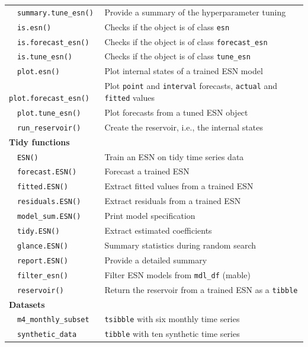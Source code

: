 \begin{longtable}[]{@{}
  >{\raggedright\arraybackslash}p{}
  >{\raggedright\arraybackslash}p{}@{}}
\(~~~\) \texttt{summary.tune\_esn()} & Provide a summary of the hyperparameter tuning \\
\(~~~\) \texttt{is.esn()} & Checks if the object is of class \texttt{esn} \\
\(~~~\) \texttt{is.forecast\_esn()} & Checks if the object is of class \texttt{forecast\_esn} \\
\(~~~\) \texttt{is.tune\_esn()} & Checks if the object is of class \texttt{tune\_esn} \\
\(~~~\) \texttt{plot.esn()} & Plot internal states of a trained ESN model \\
\(~~~\) \texttt{plot.forecast\_esn()} & Plot \texttt{point} and \texttt{interval} forecasts, \texttt{actual} and \texttt{fitted} values \\
\(~~~\) \texttt{plot.tune\_esn()} & Plot forecasts from a tuned ESN object \\
\(~~~\) \texttt{run\_reservoir()} & Create the reservoir, i.e., the internal states \\
\textbf{Tidy functions} & \\
\(~~~\) \texttt{ESN()} & Train an ESN on tidy time series data \\
\(~~~\) \texttt{forecast.ESN()} & Forecast a trained ESN \\
\(~~~\) \texttt{fitted.ESN()} & Extract fitted values from a trained ESN \\
\(~~~\) \texttt{residuals.ESN()} & Extract residuals from a trained ESN \\
\(~~~\) \texttt{model\_sum.ESN()} & Print model specification \\
\(~~~\) \texttt{tidy.ESN()} & Extract estimated coefficients \\
\(~~~\) \texttt{glance.ESN()} & Summary statistics during random search \\
\(~~~\) \texttt{report.ESN()} & Provide a detailed summary \\
\(~~~\) \texttt{filter\_esn()} & Filter ESN models from \texttt{mdl\_df} (mable) \\
\(~~~\) \texttt{reservoir()} & Return the reservoir from a trained ESN as a \texttt{tibble} \\
\textbf{Datasets} & \\
\(~~~\) \texttt{m4\_monthly\_subset} & \texttt{tsibble} with six monthly time series \\
\(~~~\) \texttt{synthetic\_data} & \texttt{tibble} with ten synthetic time series \\
\end{longtable}

